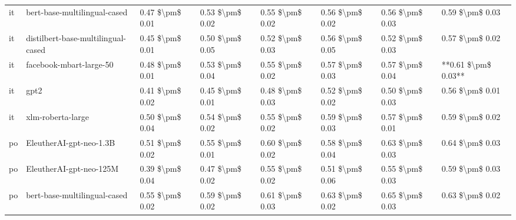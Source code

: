 \begin{tabular}{llllllll}
      it &       bert-base-multilingual-cased & 0.47 \$\textbackslash pm\$ 0.01 &           0.53 \$\textbackslash pm\$ 0.02 &       0.55 \$\textbackslash pm\$ 0.02 &        0.56 \$\textbackslash pm\$ 0.02 &                         0.56 \$\textbackslash pm\$ 0.03 &     0.59 \$\textbackslash pm\$ 0.03 \\
      it & distilbert-base-multilingual-cased & 0.45 \$\textbackslash pm\$ 0.01 &           0.50 \$\textbackslash pm\$ 0.05 &       0.52 \$\textbackslash pm\$ 0.03 &        0.56 \$\textbackslash pm\$ 0.05 &                         0.52 \$\textbackslash pm\$ 0.03 &     0.57 \$\textbackslash pm\$ 0.02 \\
      it &            facebook-mbart-large-50 & 0.48 \$\textbackslash pm\$ 0.01 &           0.53 \$\textbackslash pm\$ 0.04 &       0.55 \$\textbackslash pm\$ 0.02 &        0.57 \$\textbackslash pm\$ 0.03 &                         0.57 \$\textbackslash pm\$ 0.04 & **0.61 \$\textbackslash pm\$ 0.03** \\
      it &                               gpt2 & 0.41 \$\textbackslash pm\$ 0.02 &           0.45 \$\textbackslash pm\$ 0.01 &       0.48 \$\textbackslash pm\$ 0.03 &        0.52 \$\textbackslash pm\$ 0.02 &                         0.50 \$\textbackslash pm\$ 0.03 &     0.56 \$\textbackslash pm\$ 0.01 \\
      it &                  xlm-roberta-large & 0.50 \$\textbackslash pm\$ 0.04 &           0.54 \$\textbackslash pm\$ 0.02 &       0.55 \$\textbackslash pm\$ 0.02 &        0.59 \$\textbackslash pm\$ 0.03 &                         0.57 \$\textbackslash pm\$ 0.01 &     0.59 \$\textbackslash pm\$ 0.02 \\
      po &            EleutherAI-gpt-neo-1.3B & 0.51 \$\textbackslash pm\$ 0.02 &           0.55 \$\textbackslash pm\$ 0.01 &       0.60 \$\textbackslash pm\$ 0.02 &        0.58 \$\textbackslash pm\$ 0.04 &                         0.63 \$\textbackslash pm\$ 0.03 &     0.64 \$\textbackslash pm\$ 0.03 \\
      po &            EleutherAI-gpt-neo-125M & 0.39 \$\textbackslash pm\$ 0.04 &           0.47 \$\textbackslash pm\$ 0.02 &       0.55 \$\textbackslash pm\$ 0.02 &        0.51 \$\textbackslash pm\$ 0.06 &                         0.55 \$\textbackslash pm\$ 0.03 &     0.59 \$\textbackslash pm\$ 0.03 \\
      po &       bert-base-multilingual-cased & 0.55 \$\textbackslash pm\$ 0.02 &           0.59 \$\textbackslash pm\$ 0.02 &       0.61 \$\textbackslash pm\$ 0.03 &        0.63 \$\textbackslash pm\$ 0.02 &                         0.65 \$\textbackslash pm\$ 0.03 &     0.63 \$\textbackslash pm\$ 0.02 \\

\end{tabular}
